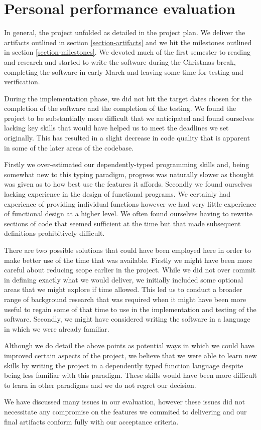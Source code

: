 \section{Personal performance evaluation}

In general, the project unfolded as detailed in the project plan. We
deliver the artifacts outlined in section \ref{section-artifacts} and we
hit the milestones outlined in section \ref{section-milestones}. We
devoted much of the first semester to reading and research and started
to write the software during the Christmas break, completing the
software in early March and leaving some time for testing and verification.

During the implementation phase, we did not hit the target
dates chosen for the completion of the software and the completion of
the testing. We found the project to be substantially more difficult
that we anticipated and found ourselves lacking key skills that would
have helped us to meet the deadlines we set originally. This has
resulted in a slight decrease in code quality that is apparent in some
of the later areas of the codebase.

Firstly we over-estimated our dependently-typed programming skills and,
being somewhat new to this typing paradigm, progress was naturally
slower as thought was given as to how best use the features it
affords. Secondly we found ourselves lacking experience in the design
of functional programs. We certainly had experience of providing
individual functions however we had very little experience of
functional design at a higher level. We often found ourselves having
to rewrite sections of code that seemed sufficient at the time but
that made subsequent definitions prohibitively difficult.

There are two possible solutions that could have been employed here in
order to make better use of the time that was available. Firstly we
might have been more careful about reducing scope earlier in the
project. While we did not over commit in defining exactly what we
would deliver, we initially included some optional areas that we might
explore if time allowed. This led us to conduct a broader range of
background research that was required when it might have been
more useful to regain some of that time to use in the implementation
and testing of the software. Secondly, we might have considered
writing the software in a language in which we were already familiar.

Although we do detail the above points as potential ways in which we
could have improved certain aspects of the project, we believe that we
were able to learn new skills by writing the project in a
dependently typed function language despite being less familiar with
this paradigm. These skills would have been more difficult to learn
in other paradigms and we do not regret our decision.

We have discussed many issues in our evaluation, however these issues
did not necessitate any compromise on the features we commited to delivering
and our final artifacts conform fully with our acceptance criteria.
